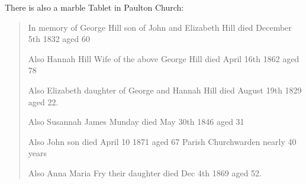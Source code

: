 There is also a marble Tablet in Paulton Church:

\begin{quotation}
In memory of George Hill son of John and Elizabeth Hill died December 5th 1832 aged 60

Also Hannah Hill Wife of the above George Hill died April 16th 1862 aged 78

Also Elizabeth daughter of George and Hannah Hill died August 19th 1829 aged 22.

Also Susannah James Munday died May 30th 1846 aged 31

Also John son died April 10 1871 aged 67 Parish Churchwarden nearly 40 years

Also Anna Maria Fry their daughter died Dec 4th 1869 aged 52.
\end{quotation}
